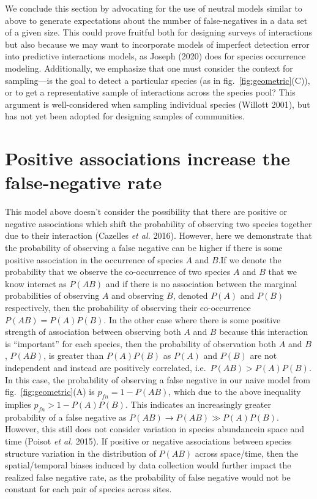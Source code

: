 \documentclass[10pt,oneside]{article}
\begin{document}
We conclude this section by advocating for the use of neutral models
similar to above to generate expectations about the number of
false-negatives in a data set of a given size. This could prove fruitful
both for designing surveys of interactions but also because we may want
to incorporate models of imperfect detection error into predictive
interactions models, as Joseph (2020) does for species occurrence
modeling. Additionally, we emphasize that one must consider the context
for sampling---is the goal to detect a particular species (as in
fig.~\ref{fig:geometric}(C)), or to get a representative sample of
interactions across the species pool? This argument is well-considered
when sampling individual species (Willott 2001), but has not yet been
adopted for designing samples of communities.

\hypertarget{positive-associations-increase-the-false-negative-rate}{%
\section{Positive associations increase the false-negative
rate}\label{positive-associations-increase-the-false-negative-rate}}

This model above doesn't consider the possibility that there are
positive or negative associations which shift the probability of
observing two species together due to their interaction (Cazelles
\emph{et al.} 2016). However, here we demonstrate that the probability
of observing a false negative can be higher if there is some positive
association in the occurrence of species \(A\) and \(B\).If we denote
the probability that we observe the co-occurrence of two species \(A\)
and \(B\) that we know interact as \(P(AB)\) and if there is no
association between the marginal probabilities of observing \(A\) and
observing \(B\), denoted \(P(A)\) and \(P(B)\) respectively, then the
probability of observing their co-occurrence \(P(AB) = P(A)P(B)\). In
the other case where there is some positive strength of association
between observing both \(A\) and \(B\) because this interaction is
``important'' for each species, then the probability of observation both
\(A\) and \(B\), \(P(AB)\), is greater than \(P(A)P(B)\) as \(P(A)\) and
\(P(B)\) are not independent and instead are positively correlated,
i.e.~\(P(AB)> P(A)P(B)\). In this case, the probability of observing a
false negative in our naive model from fig.~\ref{fig:geometric}(A) is
\(p_{fn}= 1-P(AB)\), which due to the above inequality implies
\(p_{fn} >1-P(A)P(B)\). This indicates an increasingly greater
probability of a false negative as \(P(AB) \to P(AB) \gg P(A)P(B)\).
However, this still does not consider variation in species abundancein
space and time (Poisot \emph{et al.} 2015). If positive or negative
associations between species structure variation in the distribution of
\(P(AB)\) across space/time, then the spatial/temporal biases induced by
data collection would further impact the realized false negative rate,
as the probability of false negative would not be constant for each pair
of species across sites.
\end{document}
